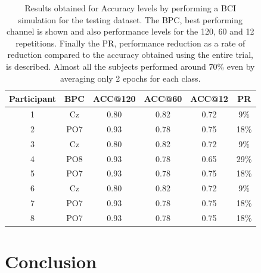 \documentclass[entropy,article,submit,moreauthors,pdftex,10pt,a4paper]{mdpi}
\begin{document}
\begin{table}[H]
\caption{Results obtained for Accuracy levels by performing a BCI simulation for the testing dataset. The BPC, best performing channel is shown and also performance levels for the 120, 60 and 12 repetitions. Finally the PR, performance reduction as a rate of reduction compared to the accuracy obtained using the entire trial, is described.  Almost all the subjects performed around 70\% even by averaging only 2 epochs for each class.}
\centering
\begin{tabular}{cccccc}
\toprule
\textbf{Participant}	& \textbf{BPC}	& \textbf{ACC@120}	& \textbf{ACC@60}	&  \textbf{ACC@12} & \textbf{PR}\\
\midrule
1 & Cz &   0.80 &   0.82 &   0.72 & 9\% \\
2 & PO7 &   0.93 &   0.78 &   0.75 & 18\%\\
3 & Cz &   0.80 &   0.82 &   0.72 & 9\%\\
4 & PO8 &   0.93 &   0.78 &   0.65 & 29\%\\
5 & PO7 &   0.93 &   0.78 &   0.75 & 18\%\\
6 & Cz &   0.80 &   0.82 &   0.72 & 9\%\\
7 & PO7 &   0.93 &   0.78 &   0.75 & 18\%\\
8 & PO7 &   0.93 &   0.78 &   0.75 & 18\%\\
\bottomrule
\end{tabular}
\label{tab:singletrialreduction}
\end{table}

%
%
%
%
%
%


\section{Conclusion}
\end{document}
